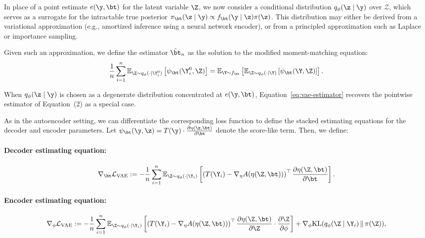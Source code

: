 In place of a point estimate \( e(\y, \bt) \) for the latent variable \( \Z \), we now consider a conditional distribution \( q_\phi(\z \mid \y) \) over \( \mathcal{Z} \), which serves as a surrogate for the intractable true posterior \( \pi_\bt(\z \mid \y) \propto f_\bt(\y \mid \z)\pi(\z) \). This distribution may either be derived from a variational approximation (e.g., amortized inference using a neural network encoder), or from a principled approximation such as Laplace or importance sampling.

Given such an approximation, we define the estimator \( \hat\bt_n \) as the solution to the modified moment-matching equation:
\begin{equation}
\label{eq:vae-estimator}
\frac{1}{n} \sum_{i=1}^n \mathbb{E}_{\Z \sim q_\phi(\cdot \mid \Y_i^0)} \left[ \psi_\bt(\Y_i^0, \Z) \right]
=
\mathbb{E}_{\Y \sim f_\bt}
\left[
\mathbb{E}_{\Z \sim q_\phi(\cdot \mid \Y)} 
\left[ 
\psi_\bt(\Y, \Z)
\right]
\right].
\end{equation}

When \( q_\phi(\z \mid \y) \) is chosen as a degenerate distribution concentrated at \( e(\y, \bt) \), Equation~\eqref{eq:vae-estimator} recovers the pointwise estimator of Equation~(2) as a special case.

As in the autoencoder setting, we can differentiate the corresponding loss function to define the stacked estimating equations for the decoder and encoder parameters. Let \( \psi_\bt(\y, \z) = T(\y) \cdot \frac{\partial \eta(\z, \bt)}{\partial \bt} \) denote the score-like term. Then, we define:

\paragraph{Decoder estimating equation:}
\begin{align*}
\nabla_\bt \mathcal{L}_{\text{VAE}} := 
- \frac{1}{n} \sum_{i=1}^n \mathbb{E}_{\Z \sim q_\phi(\cdot \mid \Y_i)} 
\left[
\left( T(\Y_i) - \nabla_\eta A(\eta(\Z, \bt)) \right)^\top 
\frac{\partial \eta(\Z, \bt)}{\partial \bt}
\right].
\end{align*}

\paragraph{Encoder estimating equation:}
\begin{align*}
\nabla_\phi \mathcal{L}_{\text{VAE}} := 
- \frac{1}{n} \sum_{i=1}^n \mathbb{E}_{\Z \sim q_\phi(\cdot \mid \Y_i)} 
\left[
\left( T(\Y_i) - \nabla_\eta A(\eta(\Z, \bt)) \right)^\top 
\frac{\partial \eta(\Z, \bt)}{\partial \Z} \cdot 
\frac{\partial \Z}{\partial \phi}
\right]
+
\nabla_\phi \text{KL}(q_\phi(\Z \mid \Y_i) \,\|\, \pi(\Z)),
\end{align*}

